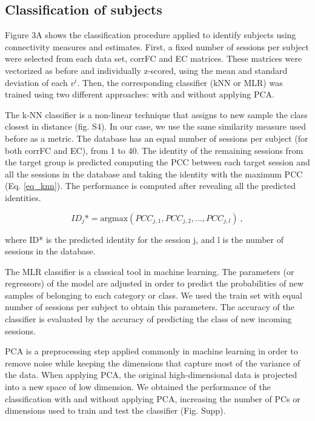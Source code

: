 \documentclass{article}
\begin{document}
\subsection{Classification of subjects}

Figure 3A shows the classification procedure applied to identify subjects using connectivity measures and estimates. First, a fixed number of sessions per subject were selected from each data set, corrFC and EC matrices. These matrices were vectorized as before and individually z-scored, using the mean and standard deviation of each $v^i$. Then, the corresponding classifier (kNN or MLR) was trained using two different approaches: with and without applying PCA. 

The k-NN classifier is a non-linear technique that assigns to new sample the class closest in distance (fig. S4). In our case, we use the same similarity measure used before as a metric. The database has an equal number of sessions per subject (for both corrFC and EC), from 1 to 40. The identity of the remaining sessions from the target group is predicted computing the PCC between each target session and all the sessions in the database and taking the identity with the maximum PCC (Eq. \ref{eq_knn}). The performance is computed after revealing all the predicted identities.  

\begin{equation} \label{eq_knn}
ID_j* = {\mathrm{argmax}}({PCC_{j,1}, PCC_{j,2}, ..., PCC_{j,l}}) 
\ ,
\end{equation}

where ID* is the predicted identity for the session j, and l is the number of sessions in the database. 

The MLR classifier is a classical tool in machine learning. The parameters (or regressors) of the model are adjusted in order to predict the probabilities of new samples of belonging to each category or class. We used the train set with equal number of sessions per subject to obtain this parameters. The accuracy of the classifier is evaluated by the accuracy of predicting the class of new incoming sessions. 

PCA is a preprocessing step applied commonly in machine learning in order to remove noise while keeping the dimensions that capture most of the variance of the data. When applying PCA, the original high-dimensional data is projected into a new space of low dimension. We obtained the performance of the classification with and without applying PCA, increasing the number of PCs or dimensions used to train and test the classifier (Fig. Supp). 
\end{document}
